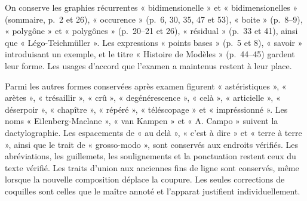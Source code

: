 \par\smallskip
On conserve les graphies récurrentes « bidimensionelle » et
« bidimensionelles » (sommaire, p.~2 et 26), « occurence » (p.~6, 30, 35,
47 et 53), « boite » (p.~8--9), « polygône » et « polygônes » (p.~20--21
et 26), « résidual » (p.~33 et 41), ainsi que « Légo-Teichmüller ».
Les expressions « points bases »
(p.~5 et 8), « savoir » introduisant un exemple, et le titre « Histoire
de Modèles » (p.~44--45) gardent leur forme. Les usages d'accord que
l'examen a maintenus restent à leur place.
\par
Parmi les autres formes conservées après examen figurent « astéristiques »,
« arètes », « trésaillir », « crû », « degénérescence », « celà »,
« articielle », « déserpoir », « chapître », « répéré », « téléscopage »
et « impréssionné ». Les noms « Eilenberg-Maclane », « van Kampen » et « A. Campo » suivent
la dactylographie. Les espacements de « au delà », « c'est à dire »
et « terre à terre », ainsi que le trait de « grosso-modo », sont
conservés aux endroits vérifiés. Les abréviations, les guillemets,
les soulignements et la ponctuation restent ceux du texte vérifié.
Les traits d'union aux anciennes fins de ligne sont conservés, même
lorsque la nouvelle composition déplace la coupure. Les seules
corrections de coquilles sont celles que le maître annoté et l'apparat
justifient individuellement.
